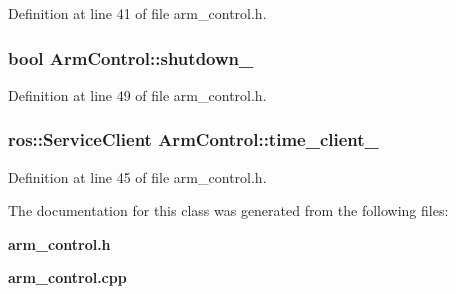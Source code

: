 \-Definition at line 41 of file arm\-\_\-control.\-h.

\subsubsection[{shutdown\-\_\-}]{\setlength{\rightskip}{0pt plus 5cm}bool {\bf \-Arm\-Control\-::shutdown\-\_\-}\hspace{0.3cm}{\ttfamily  [private]}}\label{classArmControl_ad5509d7953165026c865c1cb64785ab3}


\-Definition at line 49 of file arm\-\_\-control.\-h.

\subsubsection[{time\-\_\-client\-\_\-}]{\setlength{\rightskip}{0pt plus 5cm}ros\-::\-Service\-Client {\bf \-Arm\-Control\-::time\-\_\-client\-\_\-}\hspace{0.3cm}{\ttfamily  [private]}}\label{classArmControl_aa2dabe49a9e661441d6a641e4aec94e9}


\-Definition at line 45 of file arm\-\_\-control.\-h.



\-The documentation for this class was generated from the following files\-:\begin{DoxyCompactItemize}
\item 
{\bf arm\-\_\-control.\-h}\item 
{\bf arm\-\_\-control.\-cpp}\end{DoxyCompactItemize}
